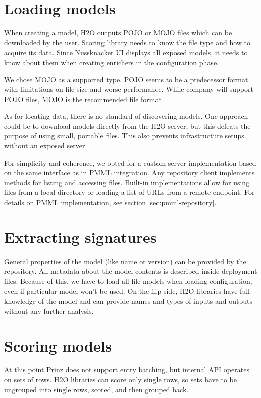 \section{Loading models}

When creating a model, H2O outputs POJO or MOJO files which can be downloaded by the user.
Scoring library needs to know the file type and how to acquire its data.
Since Nussknacker UI displays all exposed models, it needs to know about them when creating enrichers in the configuration phase.

We chose MOJO as a supported type.
POJO seems to be a predecessor format with limitations on file size and worse performance.
While company will support POJO files, MOJO is the recommended file format \cite{h2o-mojo-over-pojo}.

As for locating data, there is no standard of discovering models.
One approach could be to download models directly from the H2O server, but this defeats the purpose of using small, portable files.
This also prevents infrastructure setups without an exposed server.

For simplicity and coherence, we opted for a custom server implementation based on the same interface as in PMML integration.
Any repository client implements methods for listing and accessing files.
Built-in implementations allow for using files from a local directory or loading a list of URLs from a remote endpoint.
For details on PMML implementation, see section \ref{sec:pmml-repository}.

\section{Extracting signatures}

General properties of the model (like name or version) can be provided by the repository.
All metadata about the model contents is described inside deployment files.
Because of this, we have to load all file models when loading configuration, even if particular model won't be used.
On the flip side, H2O libraries have full knowledge of the model and can provide names and types of inputs and outputs without any further analysis.

\section{Scoring models}

At this point Prinz does not support entry batching, but internal API operates on sets of rows.
H2O libraries can score only single rows, so sets have to be ungrouped into single rows, scored, and then grouped back.

